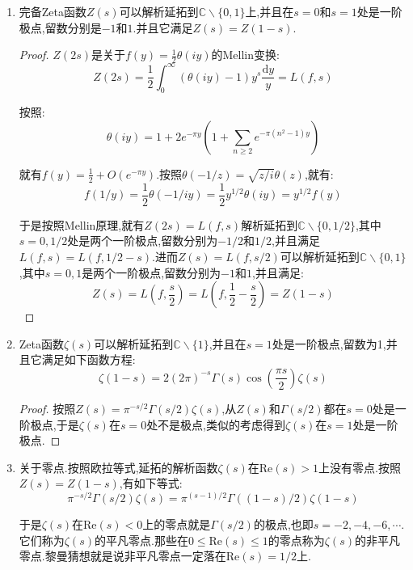 \begin{enumerate}
\begin{proof}
    	其中:
    	$$G(s)=\int_1^{\infty}\left((g(y)-b_0)y^s+C^{-1}(f(y)-a_0)y^{k-s}\right)\frac{\mathrm{d}y}{y}$$
    	
    	这里$F(s)$和$G(s)$在整个复平面上绝对收敛,且内闭一致收敛.于是上面等式就把$L(f,s)$和$L(g,s)$解析延拓到$\mathbb{C}\backslash\{0,k\}$上,并且有$L(f,s)=CL(g,k-s)$.
    \end{proof}
    \item 完备Zeta函数$Z(s)$可以解析延拓到$\mathbb{C}\backslash\{0,1\}$上,并且在$s=0$和$s=1$处是一阶极点,留数分别是$-1$和$1$.并且它满足$Z(s)=Z(1-s)$.
    \begin{proof}
    	
    	$Z(2s)$是关于$f(y)=\frac{1}{2}\theta(iy)$的Mellin变换:
    	$$Z(2s)=\frac{1}{2}\int_0^{\infty}\left(\theta(iy)-1\right)y^s\frac{\mathrm{d}y}{y}=L(f,s)$$
    	
    	按照:
    	$$\theta(iy)=1+2e^{-\pi y}\left(1+\sum_{n\ge2}e^{-\pi(n^2-1)y}\right)$$
    	
    	就有$f(y)=\frac{1}{2}+O(e^{-\pi y})$.按照$\theta(-1/z)=\sqrt{z/i}\theta(z)$,就有:
    	$$f(1/y)=\frac{1}{2}\theta(-1/iy)=\frac{1}{2}y^{1/2}\theta(iy)=y^{1/2}f(y)$$
    	
    	于是按照Mellin原理,就有$Z(2s)=L(f,s)$解析延拓到$\mathbb{C}\backslash\{0,1/2\}$,其中$s=0,1/2$处是两个一阶极点,留数分别为$-1/2$和$1/2$,并且满足$L(f,s)=L(f,1/2-s)$.进而$Z(s)=L(f,s/2)$可以解析延拓到$\mathbb{C}\backslash\{0,1\}$,其中$s=0,1$是两个一阶极点,留数分别为$-1$和$1$,并且满足:
    	$$Z(s)=L(f,\frac{s}{2})=L(f,\frac{1}{2}-\frac{s}{2})=Z(1-s)$$
    \end{proof}
    \item Zeta函数$\zeta(s)$可以解析延拓到$\mathbb{C}\backslash\{1\}$,并且在$s=1$处是一阶极点,留数为1,并且它满足如下函数方程:
    $$\zeta(1-s)=2(2\pi)^{-s}\Gamma(s)\cos\left(\frac{\pi s}{2}\right)\zeta(s)$$
    \begin{proof}
    	
    	按照$Z(s)=\pi^{-s/2}\Gamma(s/2)\zeta(s)$,从$Z(s)$和$\Gamma(s/2)$都在$s=0$处是一阶极点,于是$\zeta(s)$在$s=0$处不是极点,类似的考虑得到$\zeta(s)$在$s=1$处是一阶极点.
    \end{proof}
    \item 关于零点.按照欧拉等式,延拓的解析函数$\zeta(s)$在$\mathrm{Re}(s)>1$上没有零点.按照$Z(s)=Z(1-s)$,有如下等式:
    $$\pi^{-s/2}\Gamma(s/2)\zeta(s)=\pi^{(s-1)/2}\Gamma((1-s)/2)\zeta(1-s)$$
    
    于是$\zeta(s)$在$\mathrm{Re}(s)<0$上的零点就是$\Gamma(s/2)$的极点,也即$s=-2,-4,-6,\cdots$.它们称为$\zeta(s)$的平凡零点.那些在$0\le\mathrm{Re}(s)\le1$的零点称为$\zeta(s)$的非平凡零点.黎曼猜想就是说非平凡零点一定落在$\mathrm{Re}(s)=1/2$上.
\end{enumerate}
